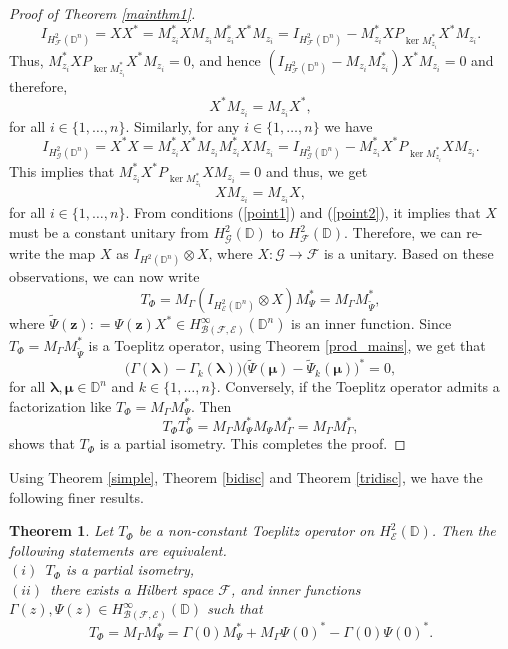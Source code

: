 \documentclass[12pt]{amsart}
\newtheorem{thm}[propn]{Theorem}
\theoremstyle{definition}
\newcommand{\D}{\mathbb{D}}
\newcommand{\1}{{\mbox{\bf 1}}}
\newcommand{\clb}{\mathcal{B}}
\newcommand{\cle}{\mathcal{E}}
\newcommand{\clf}{\mathcal{F}}
\newcommand{\clg}{\mathcal{G}}
\newcommand{\raro}{\rightarrow}
\begin{document}
\begin{proof}[Proof of Theorem \ref{mainthm1}]
\[
I_{H_{\clf}^2(\D^n)} = X X^* = M_{z_i}^* X M_{z_i}M_{z_i}^*X^*M_{z_i} =I_{H_{\clf}^2(\D^n)} - M_{z_i}^* X P_{\ker M_{z_i}^*} X^*M_{z_i} .
\]
Thus, $M_{z_i}^* X P_{\ker M_{z_i}^*} X^*M_{z_i} = 0$, and hence $(I_{H_{\clf}^2(\D^n)}- M_{z_i} M_{z_i}^*) X^* M_{z_i} = 0$ and therefore, 
\begin{equation}\label{point1}
X^* M_{z_i}  = M_{z_i} X^*,
\end{equation}
for all $i \in \{1,\ldots,n\}$.  Similarly, for any $i \in \{1,\ldots,n\}$ we have
\[
 I_{H_{\clg}^2(\D^n)} = X^* X = M_{z_i}^* X^* M_{z_i}M_{z_i}^*XM_{z_i} =I_{H_{\clg}^2(\D^n)} - M_{z_i}^* X^* P_{\ker M_{z_i}^*} X M_{z_i}.
\]
This implies that $M_{z_i}^* X^* P_{\ker M_{z_i}^*} X M_{z_i} = 0$ and thus, we get
\begin{equation}\label{point2}
X M_{z_i}  = M_{z_i} X,
\end{equation}
for all $i \in \{1,\ldots,n\}$. From conditions (\ref{point1}) and (\ref{point2}), it implies that $X$ must be a constant unitary from $H_{\clg}^2(\D)$ to  $H_{\clf}^2(\D)$. Therefore, we can re-write the map $X$ as $I_{H^2(\D^n)} \otimes X$, where $X: \clg \raro \clf$ is a unitary. Based on these observations, we can now write
\[
T_{\Phi} = M_{\Gamma}  (I_{H_{\cle}^2(\D^n)} \otimes X) M_{\Psi}^* = M_{\Gamma} M_{\tilde{\Psi}} ^*,
\]
where $\tilde{\Psi}(\bm{z}): = \Psi(\bm{z}) X^* \in H_{\clb(\clf,\cle)}^{\infty}(\D^n)$ is an inner function. Since $T_{\Phi} = M_{\Gamma} M_{\tilde{\Psi}} ^*$ is a Toeplitz operator,  using Theorem \ref{prod_mains}, we get that
\[
\big( \Gamma(\bm{\lambda}) - \Gamma_k(\bm{\lambda}) \big) \big( \tilde{\Psi}(\bm{\mu}) - \tilde{\Psi}_k(\bm{\mu})\big)^* = 0,
\]
for all $\bm{\lambda}, \bm{\mu} \in \D^n$ and $k \in \{1,\ldots,n\}$.
Conversely, if the Toeplitz operator admits a factorization like $T_{\Phi} = M_{\Gamma} M_{\Psi}^*$. Then 
\[
T_{\Phi} T_{\Phi}^* = M_{\Gamma} M_{\Psi}^* M_{\Psi} M_{\Gamma}^* = M_{\Gamma}M_{\Gamma}^*,
\]
shows that $T_{\Phi}$ is a partial isometry. This completes the proof.
\end{proof}
Using Theorem \ref{simple}, Theorem \ref{bidisc} and Theorem \ref{tridisc}, we have the following finer results.
\begin{thm}\label{psimple}
Let $T_{\Phi}$ be a non-constant Toeplitz operator on $H_{\cle}^2(\D)$. Then the following statements are equivalent.\\
$(i)$~$T_{\Phi}$ is a partial isometry,\\
$(ii)$~there exists a Hilbert space $\clf$,  and inner functions $\Gamma(z), \Psi(z) \in H_{\clb(\clf, \cle)}^{\infty}(\D)$ such that
\[
T_{\Phi} = M_{\Gamma}M_{\Psi}^*  
=  \Gamma(0) M_{\Psi}^* + M_{\Gamma} \Psi(0)^* - \Gamma(0) \Psi(0)^*.
\]
\end{thm}
\end{document}
